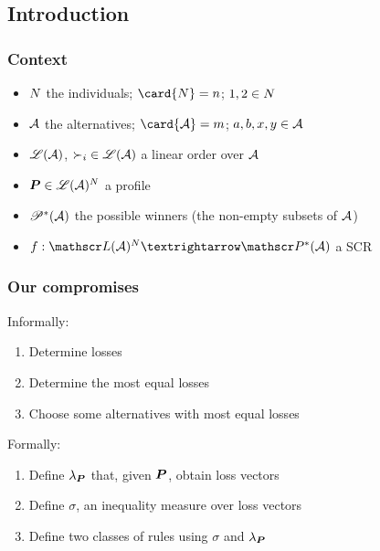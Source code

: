 \documentclass[french, english]{beamer}
\begin{document}
\subsection{Introduction}
\begin{frame}
	\frametitle{Context}
	\begin{itemize}
		\item $N$ the individuals; $\card{\voters} = n$; $1, 2 \in N$
		\item $\mathcal{A}$ the alternatives; $\card{\allalts} = m$; $a, b, x, y \in \mathcal{A}$
		\item $\mathscr{L}(\mathcal{A})$, ${\prefi} \in \linors$ a linear order over $\mathcal{A}$
		\item $\boldsymbol{P} \in \mathscr{L}(\mathcal{A})^N$ a profile
		\item $\mathscr{P}^*(\mathcal{A})$ the possible winners (the non-empty subsets of $\mathcal{A}$)
		\item $f: \linors^\voters → \powersetz{\allalts}$ a \ac{SCR}
	\end{itemize}
	\begin{example}
		\centering
	\end{example}
\end{frame}

\begin{frame}
	\frametitle{Our compromises}
	Informally:
	\begin{enumerate}
		\item Determine losses
		\item Determine the most equal losses
		\item Choose some alternatives with most equal losses
	\end{enumerate}
	Formally:
	\begin{enumerate}
		\item Define $\lambda_{\boldsymbol{P}}$ that, given $\boldsymbol{P}$, obtain loss vectors
		\item Define $\sigma$, an inequality measure over loss vectors
		\item Define two classes of rules using $\sigma$ and $\lambda_{\boldsymbol{P}}$
	\end{enumerate}
\end{frame}
\end{document}

